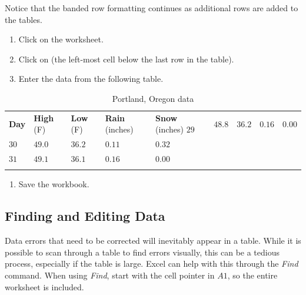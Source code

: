 Notice that the banded row formatting continues as additional rows are added to the tables.

\begin{enumbox}
	\begin{enumerate}
		\item Click on the  worksheet.
		\item Click on  (the left-most cell below the last row in the table).
		\item Enter the data from the following table.
	\end{enumerate}
\end{enumbox}
	
\begin{table}[H]
	{\small
		\begin{longtable}{R{0.50in}R{0.50in}R{0.50in}R{0.50in}R{0.50in}} %
			\textbf{Day} & \textbf{High} (\textdegree F) & \textbf{Low} (\textdegree F) & \textbf{Rain} (inches) & \textbf{Snow} (inches) \endhead
			\hline
			$ 29 $ & $ 48.8 $ & $ 36.2 $ & $ 0.16 $ & $ 0.00 $ \\ 
			$ 30 $ & $ 49.0 $ & $ 36.2 $ & $ 0.11 $ & $ 0.32 $ \\ 
			$ 31 $ & $ 49.1 $ & $ 36.1 $ & $ 0.16 $ & $ 0.00 $ \\ 
			\caption{Portland, Oregon data}
			\label{05:tab03}
		\end{longtable}
	} %
\end{table}

\begin{enumbox}
	\begin{enumerate}
		\item Save the  workbook.
	\end{enumerate}
\end{enumbox}
	
\subsection{Finding and Editing Data}

Data errors that need to be corrected will inevitably appear in a table. While it is possible to scan through a table to find errors visually, this can be a tedious process, especially if the table is large. Excel can help with this through the \textit{Find} command. When using \textit{Find}, start with the cell pointer in $ A1 $, so the entire worksheet is included.

